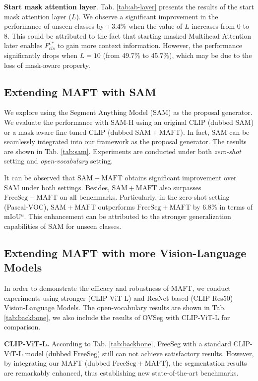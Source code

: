 \noindent \textbf{Start mask attention layer}.
Tab. \ref{tab:ab-layer} presents the results of the start mask attention layer ($L$). 
We observe a significant improvement in the performance of unseen classes by +3.4\% when the value of $L$ increases from 0 to 8. This could be attributed to the fact that starting masked Multihead Attention later enables $F^{i*}_{cls}$ to gain more context information. However, the performance significantly drops when $L=10$ (from 49.7\% to 45.7\%), which may be due to the loss of mask-aware property.

\subsection{Extending MAFT with SAM}

We explore using the Segment Anything Model \cite{kirillov2023segment} (SAM) as the proposal generator. We evaluate the performance with SAM-H using an original CLIP (dubbed $\mathrm{SAM}$) or a mask-aware fine-tuned CLIP (dubbed $\mathrm{SAM+MAFT}$). In fact, SAM can be seamlessly integrated into our framework as the proposal generator. The results are shown in Tab. \ref{tab:sam}. Experiments are conducted under both \textit{zero-shot} setting and \textit{open-vocabulary} setting.

It can be observed that $\mathrm{SAM+MAFT}$ obtains significant improvement over $\mathrm{SAM}$ under both settings. Besides, $\mathrm{SAM+MAFT}$ also surpasses $\mathrm{FreeSeg+MAFT}$ on all benchmarks. Particularly, in the zero-shot setting (Pascal-VOC), $\mathrm{SAM+MAFT}$ outperforms $\mathrm{FreeSeg+MAFT}$ by 6.8\% in terms of mIoU$^u$. This enhancement can be attributed to the stronger generalization capabilities of SAM for unseen classes. 

\subsection{Extending MAFT with more Vision-Language Models}

In order to demonstrate the efficacy and robustness of MAFT, we conduct experiments using stronger (CLIP-ViT-L) and ResNet-based (CLIP-Res50) Vision-Language Models. The open-vocabulary results are shown in Tab. \ref{tab:backbone}, we also include the results of OVSeg with CLIP-ViT-L for comparison.

\noindent \textbf{CLIP-ViT-L.}
According to Tab. \ref{tab:backbone}, FreeSeg with a standard CLIP-ViT-L model (dubbed $\mathrm{FreeSeg}$) still can not achieve satisfactory results. However, by integrating our MAFT (dubbed $\mathrm{FreeSeg+MAFT}$), the segmentation results are remarkably enhanced, thus establishing new state-of-the-art benchmarks.

